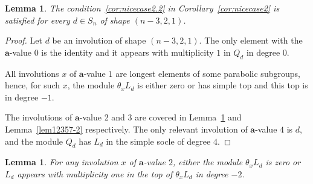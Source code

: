 \documentclass[a4paper]{amsart}
\newtheorem{lemma}[theorem]{Lemma}
\begin{document}
\begin{lemma}\label{lem.shape2cor6b}
    The condition~\eqref{cor:nicecase2.2} in Corollary~\ref{cor:nicecase2} is satisfied for every $d\in S_n$ of shape $(n-3,2,1)$. 
\end{lemma}
\begin{proof}
Let $d$ be an involution of shape $(n-3,2,1)$.
The only element with the $\mathbf{a}$-value $0$
is the identity and it appears with multiplicity $1$
in $Q_d$ in degree $0$.

All involutions $x$ of $\mathbf{a}$-value $1$ are
longest elements of some parabolic subgroups, hence,
for such $x$, the module $\theta_x L_d$ is either zero or
has simple top and this top is in degree $-1$. 

The involutions of $\mathbf{a}$-value 2 and 3 are covered in Lemma~\ref{lem-12357} and Lemma~\ref{lem12357-2} respectively.
The only relevant involution of $\mathbf{a}$-value $4$ is $d$, and the module $Q_d$ has $L_d$ in the simple socle of degree $4$.
\end{proof}


\begin{lemma}\label{lem-12357}
For any involution $x$ of $\mathbf{a}$-value $2$, either
the module $\theta_x L_d$ is zero or $L_d$ appears
with multiplicity one in the top of  $\theta_x L_d$ in degree $-2$.
\end{lemma}
\end{document}
